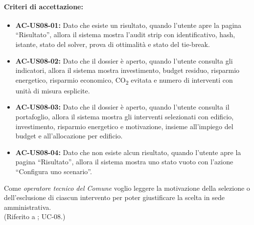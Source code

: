 \paragraph{Criteri di accettazione:}
\begin{itemize}[leftmargin=1.4em]
    \item \textbf{AC-US08-01:} Dato che esiste un risultato, quando l'utente apre la pagina ``Risultato'', allora il sistema mostra l'audit strip con identificativo, hash, istante, stato del solver, prova di ottimalità e stato del tie-break.
    \item \textbf{AC-US08-02:} Dato che il dossier è aperto, quando l'utente consulta gli indicatori, allora il sistema mostra investimento, budget residuo, risparmio energetico, risparmio economico, CO\textsubscript{2} evitata e numero di interventi con unità di misura esplicite.
    \item \textbf{AC-US08-03:} Dato che il dossier è aperto, quando l'utente consulta il portafoglio, allora il sistema mostra gli interventi selezionati con edificio, investimento, risparmio energetico e motivazione, insieme all'impiego del budget e all'allocazione per edificio.
    \item \textbf{AC-US08-04:} Dato che non esiste alcun risultato, quando l'utente apre la pagina ``Risultato'', allora il sistema mostra uno stato vuoto con l'azione ``Configura uno scenario''.
\end{itemize}

 \label{us:spiegazioni}
Come \textit{operatore tecnico del Comune} voglio leggere la motivazione della selezione o dell'esclusione di ciascun intervento per poter giustificare la scelta in sede amministrativa. \\ (Riferito a ; UC-08.)


